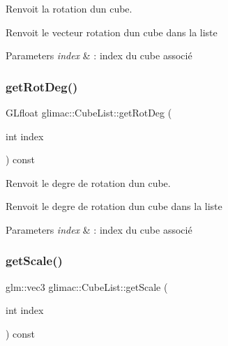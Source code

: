 Renvoit la rotation d\textquotesingle{}un cube. 

Renvoit le vecteur rotation d\textquotesingle{}un cube dans la liste


\begin{DoxyParams}{Parameters}
{\em index} & \+: index du cube associé \\
\hline
\end{DoxyParams}
\mbox{\label{classglimac_1_1CubeList_a93d0947a863b9ebef7fb7903917b42af}} 
\subsubsection{\texorpdfstring{get\+Rot\+Deg()}{getRotDeg()}}
{\footnotesize\ttfamily G\+Lfloat glimac\+::\+Cube\+List\+::get\+Rot\+Deg (\begin{DoxyParamCaption}\item[{int}]{index }\end{DoxyParamCaption}) const\hspace{0.3cm}{\ttfamily [inline]}}



Renvoit le degre de rotation d\textquotesingle{}un cube. 

Renvoit le degre de rotation d\textquotesingle{}un cube dans la liste


\begin{DoxyParams}{Parameters}
{\em index} & \+: index du cube associé \\
\hline
\end{DoxyParams}
\mbox{\label{classglimac_1_1CubeList_ad1e51727e80954e56986173ad9092eb5}} 
\subsubsection{\texorpdfstring{get\+Scale()}{getScale()}}
{\footnotesize\ttfamily glm\+::vec3 glimac\+::\+Cube\+List\+::get\+Scale (\begin{DoxyParamCaption}\item[{int}]{index }\end{DoxyParamCaption}) const\hspace{0.3cm}{\ttfamily [inline]}}



